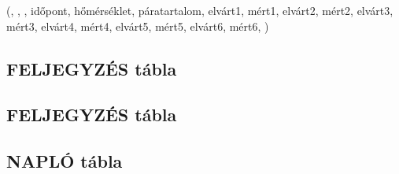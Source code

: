 (, , , időpont, hőmérséklet, páratartalom, elvárt1, mért1, elvárt2, mért2, elvárt3, mért3, elvárt4, mért4, elvárt5, mért5, elvárt6, mért6, )\\



\subsection{FELJEGYZÉS tábla}

\subsection{FELJEGYZÉS tábla}

\subsection{NAPLÓ tábla}
